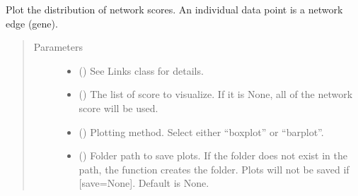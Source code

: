 \documentclass[letterpaper,10pt,english]{sphinxmanual}
\begin{document}
\begin{fulllineitems}
\begin{fulllineitems}
\label{\detokenize{modules/celloracle:celloracle.Links.plot_score_discributions}}
Plot the distribution of network scores.
An individual data point is a network edge (gene).
\begin{quote}\begin{description}
\item[{Parameters}] \leavevmode\begin{itemize}
\item {} 
 ({\hyperref[\detokenize{modules/celloracle:celloracle.Links}]{}}) \textendash{} See Links class for details.

\item {} 
 () \textendash{} The list of score to visualize. If it is None, all of the network score will be used.

\item {} 
 () \textendash{} Plotting method. Select either “boxplot” or “barplot”.

\item {} 
 () \textendash{} Folder path to save plots. If the folder does not exist in the path, the function creates the folder.
Plots will not be saved if {[}save=None{]}. Default is None.

\end{itemize}

\end{description}\end{quote}

\end{fulllineitems}



\end{fulllineitems}
\end{document}
